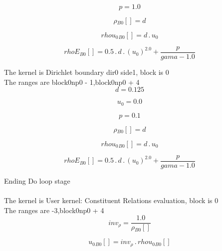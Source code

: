 \documentclass{article}
\begin{document}
\begin{dmath}p = 1.0\end{dmath}

\begin{dmath}{\rho{_{B0}}}[{}] = d\end{dmath}

\begin{dmath}{rhou_{0}{_{B0}}}[{}] = d \,.\, u_{0}\end{dmath}

\begin{dmath}{rhoE{_{B0}}}[{}] = 0.5 \,.\, d \,.\, \left(u_{0} \right)^{2.0} + \frac{p}{gama - 1.0}\end{dmath}

\noindent The kernel is Dirichlet boundary dir0 side1, block is 0\\\noindent The ranges are block0np0 - 1,block0np0 + 4\\\begin{dmath}d = 0.125\end{dmath}

\begin{dmath}u_{0} = 0.0\end{dmath}

\begin{dmath}p = 0.1\end{dmath}

\begin{dmath}{\rho{_{B0}}}[{}] = d\end{dmath}

\begin{dmath}{rhou_{0}{_{B0}}}[{}] = d \,.\, u_{0}\end{dmath}

\begin{dmath}{rhoE{_{B0}}}[{}] = 0.5 \,.\, d \,.\, \left(u_{0} \right)^{2.0} + \frac{p}{gama - 1.0}\end{dmath}

\noindent Ending Do loop stage\\
\\\noindent The kernel is User kernel: Constituent Relations evaluation, block is 0\\\noindent The ranges are -3,block0np0 + 4\\\begin{dmath}inv_{\rho} = \frac{1.0}{{\rho{_{B0}}}[{}]}\end{dmath}

\begin{dmath}{u_{0}{_{B0}}}[{}] = inv_{\rho} \,.\, {rhou_{0}{_{B0}}}[{}]\end{dmath}
\end{document}
